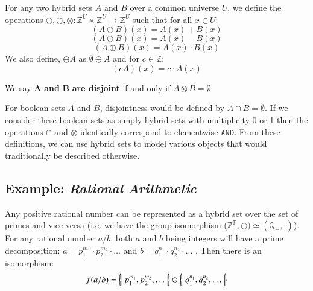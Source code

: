 \begin{definition}
	For any two hybrid sets $A$ and $B$ over a common universe $U$, 
	we define the operations $\oplus, \ominus, \otimes : \mathbb{Z}^U \times \mathbb{Z}^U \to \mathbb{Z}^U$ 
	such that for all $x \in U$:
	\begin{equation}
		(A \oplus B)(x) = A(x) + B(x)
	\end{equation}
	\begin{equation}
		(A \ominus B)(x) = A(x) - B(x)
	\end{equation}
	\begin{equation}
		(A \oplus B)(x) = A(x) \cdot B(x)
	\end{equation}
	We also define, $\ominus A$ as $\emptyset \ominus A$ and for $c \in \mathbb{Z}$:
	\begin{equation}
		(cA)(x) = c \cdot A(x)
	\end{equation}
\end{definition}


\begin{definition}
	We say $\boldsymbol{A}$ \textbf{and} $\boldsymbol{B}$ \textbf{are disjoint} if and only if $A \otimes B = \emptyset$
\end{definition}


For boolean sets $A$ and $B$, disjointness would be defined by $A \cap B = \emptyset$.
If we consider these boolean sets as simply hybrid sets with multiplicity 0 or 1 then the operations $\cap$ and $\otimes$
identically correspond to elementwise $\texttt{AND}$.
From these definitions, we can use hybrid sets to model various objects that would traditionally be described otherwise. 


\subsection{Example: \emph{Rational Arithmetic}}


Any positive rational number can be represented as a hybrid set over the set of primes and vice versa  
(i.e. we have the group isomorphism ($\mathbb{Z}^\mathbb{P}, \oplus) \simeq (\mathbb{Q}_+,\cdot)$).
For any rational number $a/b$, both $a$ and $b$ being integers will have a prime decomposition: 
$a=p_1^{m_1}\cdot p_2^{m_2} \cdot \ldots$ and $b=q_1^{n_1} \cdot q_2^{n_2} \cdot ...$ . 
Then there is an isomorphism:
\begin{equation}
	f(a/b) = \left\{ \! \left| \; p_1^{m_1}, p_2^{m_2}, \ldots \; \right| \! \right\} \ominus \left\{ \! \left| \; q_1^{n_1}, q_2^{n_2}, \ldots \; \right| \! \right\}
\end{equation}

